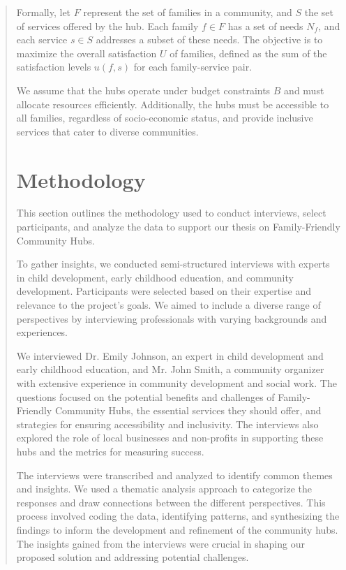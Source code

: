 \documentclass{article} %
\begin{document}
\begin{abstract}
Formally, let \( F \) represent the set of families in a community, and \( S \) the set of services offered by the hub. Each family \( f \in F \) has a set of needs \( N_f \), and each service \( s \in S \) addresses a subset of these needs. The objective is to maximize the overall satisfaction \( U \) of families, defined as the sum of the satisfaction levels \( u(f, s) \) for each family-service pair.

We assume that the hubs operate under budget constraints \( B \) and must allocate resources efficiently. Additionally, the hubs must be accessible to all families, regardless of socio-economic status, and provide inclusive services that cater to diverse communities.

\section{Methodology}
\label{sec:method}

This section outlines the methodology used to conduct interviews, select participants, and analyze the data to support our thesis on Family-Friendly Community Hubs.

To gather insights, we conducted semi-structured interviews with experts in child development, early childhood education, and community development. Participants were selected based on their expertise and relevance to the project's goals. We aimed to include a diverse range of perspectives by interviewing professionals with varying backgrounds and experiences.

We interviewed Dr. Emily Johnson, an expert in child development and early childhood education, and Mr. John Smith, a community organizer with extensive experience in community development and social work. The questions focused on the potential benefits and challenges of Family-Friendly Community Hubs, the essential services they should offer, and strategies for ensuring accessibility and inclusivity. The interviews also explored the role of local businesses and non-profits in supporting these hubs and the metrics for measuring success.

The interviews were transcribed and analyzed to identify common themes and insights. We used a thematic analysis approach to categorize the responses and draw connections between the different perspectives. This process involved coding the data, identifying patterns, and synthesizing the findings to inform the development and refinement of the community hubs. The insights gained from the interviews were crucial in shaping our proposed solution and addressing potential challenges.


\end{abstract}
\end{document}
